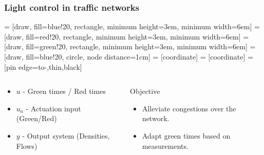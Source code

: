 \begin{frame}
    \frametitle{Light control in traffic networks}
     = [draw, fill=blue!20, rectangle, minimum height=3em, minimum width=6em]
     = [draw, fill=red!20, rectangle, minimum height=3em, minimum width=6em]
     = [draw, fill=green!20, rectangle, minimum height=3em, minimum width=6em]
     = [draw, fill=blue!20, circle, node distance=1cm]
     = [coordinate]
     = [coordinate]
     = [pin edge={to-,thin,black}]
    \begin{center}
    \end{center}
    \begin{columns}
    \begin{column}{0.5\textwidth}
    \begin{itemize}
      \item $u$ - Green times / Red times
      \item $u_a$ - Actuation input (Green/Red)
      \item $y$ - Output system (Densities, Flows)
    \end{itemize}
    \end{column}
    \begin{column}{0.5\textwidth}
      \begin{exampleblock}{Objective}
      \begin{itemize}
        \item Alleviate congestions over the network.
        \item Adapt green times based on measurements.
    \end{itemize}
      \end{exampleblock}
    \end{column}
    \end{columns}
\end{frame}